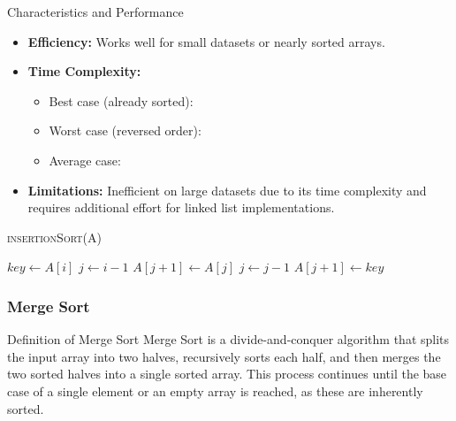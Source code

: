 \begin{properties}[]{Characteristics and Performance}
\begin{itemize}
    \item \textbf{Efficiency:} Works well for small datasets or nearly sorted arrays.
    \item \textbf{Time Complexity:}
    \begin{itemize}
        \item Best case (already sorted): 
        \item Worst case (reversed order): 
        \item Average case: 
    \end{itemize}
    \item \textbf{Limitations:} Inefficient on large datasets due to its  time complexity and requires additional effort for linked list implementations.
\end{itemize}
\end{properties}

\begin{algorithm}
    \begin{spacing}{1.2}
        \caption{\textsc{insertionSort(A)}}
        \begin{algorithmic}[1]
             
                \State $key \gets A[i]$ 
                \State $j \gets i - 1$
                    \State $A[j+1] \gets A[j]$ 
                    \State $j \gets j - 1$
                \EndWhile
                \State $A[j+1] \gets key$ 
            \EndFor
            \EndProcedure
        \end{algorithmic}
    \end{spacing}
\end{algorithm}




\newpage
\subsubsection{Merge Sort}
\begin{definition}[]{Definition of Merge Sort}
Merge Sort is a divide-and-conquer algorithm that splits the input array into two halves, recursively sorts each half, and then merges the two sorted halves into a single sorted array. This process continues until the base case of a single element or an empty array is reached, as these are inherently sorted.
\end{definition}

